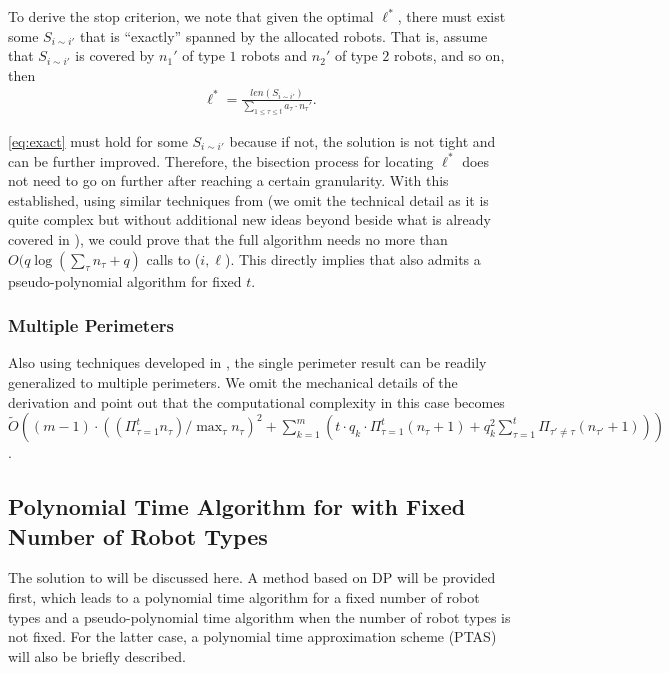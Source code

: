 To derive the stop criterion, we note that given the optimal $\ell^*$, there must 
exist some $S_{i\sim i'}$ that is ``exactly'' spanned by the allocated robots.
That is, assume that $S_{i\sim i'}$ is covered by $n_1'$ of type $1$ robots
and $n_2'$ of type $2$ robots, and so on, then 
\begin{align}\label{eq:exact}
\ell^* = \frac{len(S_{i\sim i'})}{\sum_{1 \le \tau \le t} a_{\tau}\cdot n_{\tau}'}.
\end{align}

\eqref{eq:exact} must hold for some $S_{i\sim i'}$ because if not, the solution 
is not tight and can be further improved. Therefore, the bisection process for 
locating $\ell^*$ does not need to go on further after reaching a certain granularity\cite{FenHanGaoYu19RSS}.
With this established, using 
similar techniques from \cite{FenHanGaoYu19RSS} (we omit the technical detail as it is quite 
complex but without additional new ideas beyond beside what is already covered 
in \cite{FenHanGaoYu19RSS}), we could prove that the full algorithm needs 
no more than $O(q\log(\sum_{\tau}n_{\tau}+q)$ calls to \opglrfeasible($i, \ell$).
This directly implies that \opglr also admits a pseudo-polynomial algorithm for fixed $t$.
\subsubsection{Multiple Perimeters}
Also using techniques developed in \cite{FenHanGaoYu19RSS}, the single perimeter 
result can be readily generalized to multiple perimeters. We omit the mechanical
details of the derivation and point out that the computational complexity in this case becomes
$\tilde{O}( (m-1)\cdot((\Pi_{\tau=1}^t n_\tau) / \max_\tau n_\tau)^2 + 
\sum_{k=1}^{m} (t\cdot q_k\cdot \Pi_{{\tau}=1}^{t}(n_{\tau}+1)+
q_k^2\sum_{{\tau}=1}^{t} \Pi_{{\tau'}\neq {\tau}} (n_{\tau'} +1)))$.

\subsection{Polynomial Time Algorithm for \opgmc with Fixed Number of Robot Types}
The solution to \opgmc will be discussed here. A method based on DP 
will be provided first, which leads to a polynomial time algorithm for a 
fixed number of robot types and a pseudo-polynomial time algorithm when the number 
of robot types is not fixed. For the latter case, a polynomial time approximation 
scheme (PTAS) will also be briefly described.
